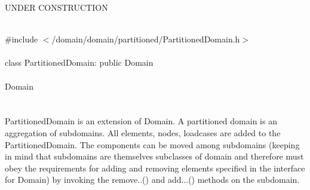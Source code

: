 
UNDER CONSTRUCTION

   \\
\indent \#include $<$/domain/domain/partitioned/PartitionedDomain.h$>$  \\

  \\
\indent class PartitionedDomain: public Domain  \\

 \\
\indent  Domain \\
\indent{} \\


  \\
\indent PartitionedDomain is an extension of Domain. A partitioned
domain is an aggregation of subdomains. All elements, nodes, loadcases
are added to the PartitionedDomain. The components can be moved among 
subdomains (keeping in mind that subdomains are themselves subclasses
of domain and therefore must obey the requirements for adding and
removing elements specified in the interface for Domain) by invoking
the remove..() and add...() methods on the subdomain. \\


